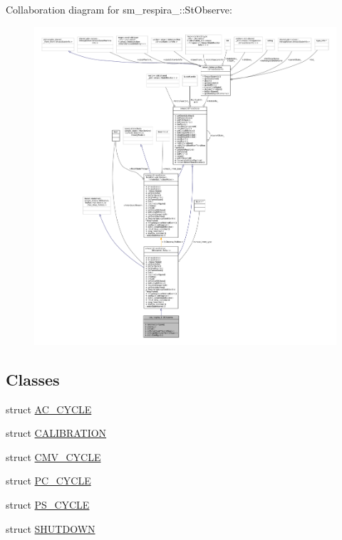 Collaboration diagram for sm\+\_\+respira\+\_\+:\+:St\+Observe\+:
\nopagebreak
\begin{figure}[H]
\begin{center}
\leavevmode
\includegraphics[width=350pt]{structsm__respira__1_1_1StObserve__coll__graph}
\end{center}
\end{figure}
\subsection*{Classes}
\begin{DoxyCompactItemize}
\item 
struct \hyperlink{structsm__respira__1_1_1StObserve_1_1AC__CYCLE}{A\+C\+\_\+\+C\+Y\+C\+LE}
\item 
struct \hyperlink{structsm__respira__1_1_1StObserve_1_1CALIBRATION}{C\+A\+L\+I\+B\+R\+A\+T\+I\+ON}
\item 
struct \hyperlink{structsm__respira__1_1_1StObserve_1_1CMV__CYCLE}{C\+M\+V\+\_\+\+C\+Y\+C\+LE}
\item 
struct \hyperlink{structsm__respira__1_1_1StObserve_1_1PC__CYCLE}{P\+C\+\_\+\+C\+Y\+C\+LE}
\item 
struct \hyperlink{structsm__respira__1_1_1StObserve_1_1PS__CYCLE}{P\+S\+\_\+\+C\+Y\+C\+LE}
\item 
struct \hyperlink{structsm__respira__1_1_1StObserve_1_1SHUTDOWN}{S\+H\+U\+T\+D\+O\+WN}
\end{DoxyCompactItemize}
